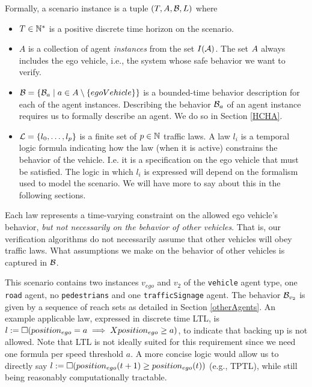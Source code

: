 Formally, a scenario instance is a tuple $(T, A,\mathcal{B}, L)$ where
\begin{itemize}
\item $T \in \mathbb{N}^*$ is a positive discrete time horizon on the scenario.
%
\item $A$ is a collection of agent \emph{instances} from the set $I(\mathcal{A})$.
The set $A$ always includes the ego vehicle, i.e., the system whose safe behavior we want to verify.
%
\item $\mathcal{B} = \{\mathcal{B}_a \;|\; a \in A \setminus \{egoVehicle\}\}$ is a bounded-time behavior description for each of the agent instances.
Describing the behavior $\mathcal{B}_a$ of an agent instance requires us to formally describe an agent. 
We do so in Section \ref{HCHA}.
%
\item $\mathcal{L} = \{l_0,\ldots,l_p\}$ is a finite set of $p \in \mathbb{N}$ traffic laws. 
A law $l_i$ is a temporal logic formula indicating how the law (when it is active) constrains the behavior of the vehicle. 
I.e. it is a specification on the ego vehicle that must be satisfied. 
The logic in which $l_i$ is expressed will depend on the formalism used to model the scenario. 
We will have more to say about this in the following sections.
\end{itemize}

Each law represents a time-varying constraint on the allowed ego vehicle's behavior, \emph{but not necessarily on the behavior of other vehicles}.
That is, our verification algorithms do not necessarily assume that other vehicles will obey traffic laws. 
What assumptions we make on the behavior of other vehicles is captured in $\mathcal{B}$.

\begin{exmp}
	This scenario contains two instances $v_{ego}$ and $v_2$ of the \texttt{vehicle} agent type, one \texttt{road} agent, no \texttt{pedestrians} and one \texttt{trafficSignage} agent.
	The behavior $\mathcal{B}_{v_2}$ is given by a sequence of reach sets as detailed in Section \ref{otherAgents}.
	An example applicable law, expressed in discrete time LTL, is $l := \square(position_{ego} = a \implies X position_{ego} \geq a)$, to indicate that backing up is not allowed.
	Note that LTL is not ideally suited for this requirement since we need one formula per speed threshold $a$. A more concise logic would allow us to directly say $l := \square(position_{ego}(t+1) \geq position_{ego}(t))$ (e.g., TPTL), while still being reasonably computationally tractable.
\end{exmp}
	
